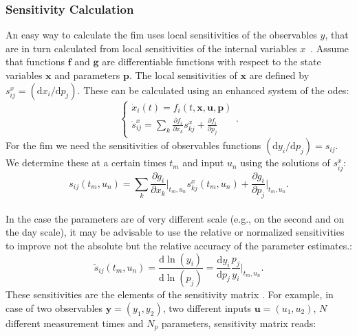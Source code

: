 \documentclass[graybox]{svmult}
\newcommand{\mbx}{\mathbf{x}}
\newcommand{\mbu}{\mathbf{u}}
\newcommand{\mbp}{\mathbf{p}}
\newcommand{\mby}{\mathbf{y}}
\newcommand{\mbg}{\mathbf{g}}
\newcommand{\mbf}{\mathbf{f}}
\begin{document}
\subsubsection*{Sensitivity Calculation}
An easy way to calculate the \ac{fim} uses local sensitivities of the observables $y$, that are in turn calculated from local sensitivities of the internal variables $x$~\cite{versyckIntroducingOptimal1999, banks_generalized_2010}.
Assume that functions $\mbf$ and $\mbg$ are differentiable functions with respect to the state variables $\mbx$ and parameters $\mbp$.
The local sensitivities of $\mbx$ are defined by $s^x_{ij} = (\mathrm{d} x_i / \mathrm{d} p_j )$.
These can be calculated using an enhanced system of the \acp{ode}:
\begin{equation}
    \begin{cases}
    \dot x_i (t) = f_i(t, \mbx, \mbu, \mbp)\\
    \dot s^x_{ij} = \sum_k \frac{\partial f_i}{\partial x_k} s^x_{kj} + \frac{\partial f_i}{\partial p_j}
    \end{cases}.
\label{eq:ode_and_sensitiv}
\end{equation}
For the \ac{fim} we need the sensitivities of observables functions $(\mathrm{d} y_i / \mathrm{d} p_j) = s_{ij}$.
We determine these at a certain times $t_m$ and input $u_n$ using the solutions of $s^x_{ij}$:
\begin{equation}
    s_{ij} (t_m, u_n) = \sum_k \frac{\partial g_i}{\partial x_k}\bigg|_{t_m, u_n} s_{kj}^x (t_m, u_n) + \frac{\partial g_i}{\partial p_j}\bigg|_{t_m, u_n}.
\label{eq:observ_sensitivities}
\end{equation}
\\
In the case the parameters are of very different scale (e.g., on the second and on the day scale), it may be advisable to use the relative or normalized sensitivities to improve not the absolute but the relative accuracy of the parameter estimates.:
\begin{equation}
    \tilde{s}_{ij} (t_m, u_n) =\frac{\mathrm{d}\ln(y_i)}{\mathrm{d}\ln(p_j)} = \frac{\mathrm{d} y_i}{\mathrm{d} p_j} \frac{p_j}{y_i}\bigg|_{t_m, u_n}.
\label{eq:relat_sensitivities}
\end{equation}
These sensitivities are the elements of the sensitivity matrix \cite{stigterObservabilityComplex2017}.
For example, in case of two observables $\mby = (y_1, y_2)$, two different inputs $\mbu = (u_1, u_2)$, $N$ different measurement times and $N_p$ parameters, sensitivity matrix reads:
\end{document}
